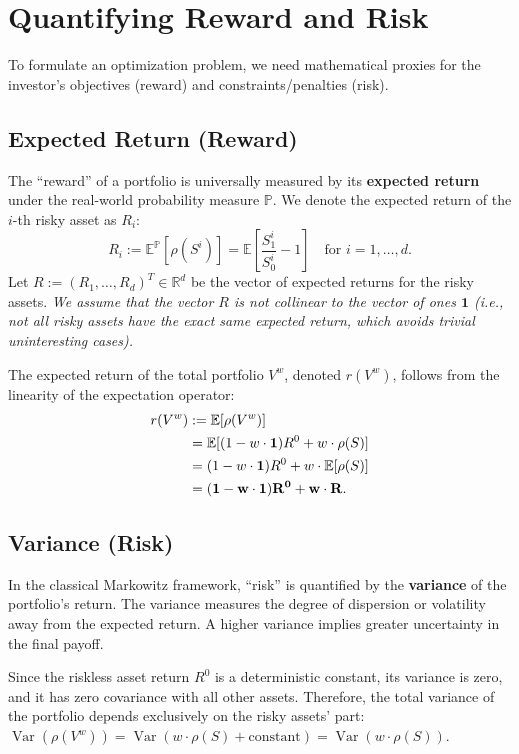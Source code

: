 \section{Quantifying Reward and Risk}

To formulate an optimization problem, we need mathematical proxies for the investor's objectives (reward) and constraints/penalties (risk).

\subsection{Expected Return (Reward)}
The ``reward'' of a portfolio is universally measured by its \textbf{expected return} under the real-world probability measure $\mathbb{P}$. We denote the expected return of the $i$-th risky asset as $R_i$:
\begin{equation}
    R_i := \mathbb{E}^{\mathbb{P}}[\rho(S^i)] = \mathbb{E} \left[ \frac{S_1^i}{S_0^i} - 1 \right] \quad \text{for } i = 1, \dots, d.
\end{equation}
Let $R := (R_1, \dots, R_d)^T \in \mathbb{R}^d$ be the vector of expected returns for the risky assets. \textit{We assume that the vector $R$ is not collinear to the vector of ones $\mathbf{1}$ (i.e., not all risky assets have the exact same expected return, which avoids trivial uninteresting cases).}

The expected return of the total portfolio $V^w$, denoted $r(V^w)$, follows from the linearity of the expectation operator:
\begin{align}
    r(V^w) &:= \mathbb{E}[\rho(V^w)] \notag \\
    &= \mathbb{E}[(1 - w \cdot \mathbf{1}) R^0 + w \cdot \rho(S)] \notag \\
    &= (1 - w \cdot \mathbf{1}) R^0 + w \cdot \mathbb{E}[\rho(S)] \notag \\
    &= \mathbf{(1 - w \cdot \mathbf{1}) R^0 + w \cdot R}. \label{eq:expected_return}
\end{align}

\subsection{Variance (Risk)}
In the classical Markowitz framework, ``risk'' is quantified by the \textbf{variance} of the portfolio's return. The variance measures the degree of dispersion or volatility away from the expected return. A higher variance implies greater uncertainty in the final payoff.

Since the riskless asset return $R^0$ is a deterministic constant, its variance is zero, and it has zero covariance with all other assets. Therefore, the total variance of the portfolio depends exclusively on the risky assets' part: $\operatorname{Var}(\rho(V^w)) = \operatorname{Var}(w \cdot \rho(S) + \text{constant}) = \operatorname{Var}(w \cdot \rho(S))$.

